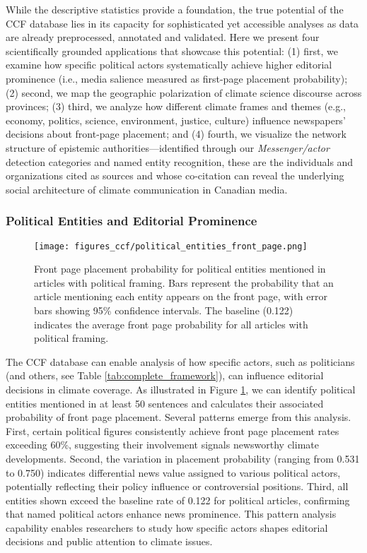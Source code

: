 \documentclass[12pt]{article}
\begin{document}
While the descriptive statistics provide a foundation, the true potential of the CCF database lies in its capacity for sophisticated yet accessible analyses as data are already preprocessed, annotated and validated. Here we present four scientifically grounded applications that showcase this potential: (1) first, we examine how specific political actors systematically achieve higher editorial prominence (i.e., media salience measured as first-page placement probability); (2) second, we map the geographic polarization of climate science discourse across provinces; (3) third, we analyze how different climate frames and themes (e.g., economy, politics, science, environment, justice, culture) influence newspapers' decisions about front-page placement; and (4) fourth, we visualize the network structure of epistemic authorities—identified through our \emph{Messenger/actor} detection categories and named entity recognition, these are the individuals and organizations cited as sources and whose co-citation can reveal the underlying social architecture of climate communication in Canadian media.

\subsubsection{Political Entities and Editorial Prominence}

\begin{figure}[!b]
\vspace*{\fill}
\centering
\texttt{[image: figures\_ccf/political\_entities\_front\_page.png]}
\caption{Front page placement probability for political entities mentioned in articles with political framing. Bars represent the probability that an article mentioning each entity appears on the front page, with error bars showing 95\% confidence intervals. The baseline (0.122) indicates the average front page probability for all articles with political framing.}
\label{fig:political_entities}
\vspace*{0pt}
\end{figure}

The CCF database can enable analysis of how specific actors, such as politicians (and others, see Table \ref{tab:complete_framework}), can influence editorial decisions in climate coverage. As illustrated in Figure \ref{fig:political_entities}, we can identify political entities mentioned in at least 50 sentences and calculates their associated probability of front page placement. Several patterns emerge from this analysis. First, certain political figures consistently achieve front page placement rates exceeding 60\%, suggesting their involvement signals newsworthy climate developments. Second, the variation in placement probability (ranging from 0.531 to 0.750) indicates differential news value assigned to various political actors, potentially reflecting their policy influence or controversial positions. Third, all entities shown exceed the baseline rate of 0.122 for political articles, confirming that named political actors enhance news prominence. This pattern analysis capability enables researchers to study how specific actors shapes editorial decisions and public attention to climate issues.
\end{document}
